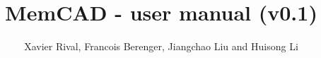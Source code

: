 \documentclass[a4paper,10pt]{book}
\begin{document}
\title{MemCAD - user manual (v0.1)}
\author{Xavier Rival, Francois Berenger, Jiangchao Liu and Huisong Li}
\maketitle
\tableofcontents
\multibegin
\raggedcolumns







\multiend


\multibegin

\multiend
\end{document}
